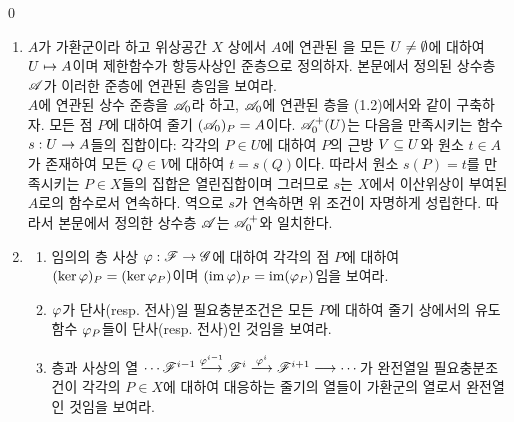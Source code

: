	\begin{lemma*}
		\qed
	\end{lemma*}
	
	\begin{enumerate}[label=\tb{1.\arabic*.},itemindent=0mm,itemsep=4mm]
	\item $A$가 가환군이라 하고 위상공간 $X$ 상에서 $A$에 연관된 을
	모든 $U\ne\emptyset$에 대하여 $U\mapsto A$이며 제한함수가 항등사상인 준층으로 정의하자.
	본문에서 정의된 상수층 $\mathscr{A}$가 이러한 준층에 연관된 층임을 보여라.\\
	\sol $A$에 연관된 상수 준층을 $\mathscr{A}_0$라 하고, $\mathscr{A}_0$에 연관된 층을 (1.2)에서와 같이 구축하자.
	모든 점 $P$에 대하여 줄기 $(\mathscr{A}_0)_P=A$이다. $\mathscr{A}_0^+(U)$는 다음을 만족시키는 함수 $s:U\rightarrow A$들의 집합이다:
	각각의 $P\in U$에 대하여 $P$의 근방 $V\subseteq U$와 원소 $t\in A$가 존재하여 모든 $Q\in V$에 대하여 $t=s(Q)$이다.
	따라서 원소 $s(P)=t$를 만족시키는 $P\in X$들의 집합은 열린집합이며
	그러므로 $s$는 $X$에서 이산위상이 부여된 $A$로의 함수로서 연속하다. 역으로 $s$가 연속하면 위 조건이 자명하게 성립한다.
	따라서 본문에서 정의한 상수층 $\mathscr{A}$는 $\mathscr{A}_0^+$와 일치한다.
	\item \begin{enumerate}[label=(\alph*)]
	\item 임의의 층 사상 $\varphi:\mathscr{F}\rightarrow\mathscr{G}$에 대하여 각각의 점 $P$에 대하여
	$(\ker\varphi)_P=(\ker\varphi_P)$이며 $(\operatorname{im}\varphi)_P=\operatorname{im}(\varphi_P)$임을 보여라.
	\item $\varphi$가 단사(resp. 전사)일 필요충분조건은 모든 $P$에 대하여
	줄기 상에서의 유도 함수 $\varphi_P$들이 단사(resp. 전사)인 것임을 보여라.
	\item 층과 사상의 열 $\cdots\mathscr{F}^{i-1}\stackrel{\varphi^{i-1}}{\longrightarrow}\mathscr{F}^i\stackrel{\varphi^i}{\longrightarrow}\mathscr{F}^{i+1}\longrightarrow\cdots$가 완전열일
	필요충분조건이 각각의 $P\in X$에 대하여 대응하는 줄기의 열들이 가환군의 열로서 완전열인 것임을 보여라.
	\end{enumerate}

\end{enumerate}
